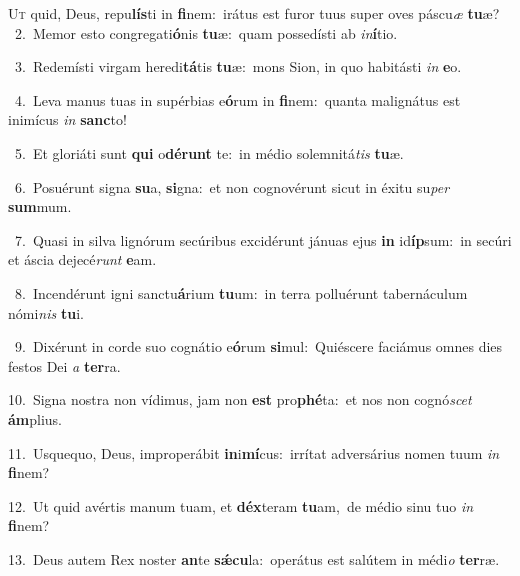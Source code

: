 \lettrine{\initial\textcolor{\initialcolor}{U}}{t} quid, Deus, repu\-\textbf{lís}\-ti in \textbf{fi}\-nem:~\star irátus est furor tuus super oves páscu\textit{æ} \textbf{tu}\-æ?\\
{\numbfont\textcolor{\numbcolor}{~2.}}~Memor esto congregati\-\textbf{ó}\-nis \textbf{tu}\-æ:~\star quam possedísti ab \textit{in}\-\textbf{í}tio.\par
{\numbfont\textcolor{\numbcolor}{~3.}}~Redemísti virgam heredi\-\textbf{tá}\-tis \textbf{tu}\-æ:~\star mons Sion, in quo habitásti \textit{in} \textbf{e}\-o.\par
{\numbfont\textcolor{\numbcolor}{~4.}}~Leva manus tuas in supérbias e\-\textbf{ó}\-rum in \textbf{fi}\-nem:~\star quanta malignátus est inimícus \textit{in} \textbf{sanc}\-to!\par
{\numbfont\textcolor{\numbcolor}{~5.}}~Et gloriáti sunt \textbf{qui} o\-\textbf{dé}\-\textbf{runt} te:~\star in médio solemnitá\textit{tis} \textbf{tu}\-æ.\par
{\numbfont\textcolor{\numbcolor}{~6.}}~Posuérunt signa \textbf{su}\-a, \textbf{si}\-gna:~\star et non cognovérunt sicut in éxitu su\textit{per} \textbf{sum}\-mum.\par
{\numbfont\textcolor{\numbcolor}{~7.}}~Quasi in silva lignórum secúribus excidérunt jánuas ejus \textbf{in} id\-\textbf{íp}\-sum:~\star in secúri et áscia dejecé\textit{runt} \textbf{e}\-am.\par
{\numbfont\textcolor{\numbcolor}{~8.}}~Incendérunt igni sanctu\-\textbf{á}\-rium \textbf{tu}\-um:~\star in terra polluérunt tabernáculum nómi\textit{nis} \textbf{tu}\-i.\par
{\numbfont\textcolor{\numbcolor}{~9.}}~Dixérunt in corde suo cognátio e\-\textbf{ó}\-rum \textbf{si}\-mul:~\star Quiéscere faciámus omnes dies festos Dei \textit{a} \textbf{ter}\-ra.\par
{\numbfont\textcolor{\numbcolor}{10.}}~Signa nostra non vídimus, jam non \textbf{est} pro\-\textbf{phé}\-ta:~\star et nos non cognó\textit{scet} \textbf{ám}\-plius.\par
{\numbfont\textcolor{\numbcolor}{11.}}~Usquequo, Deus, improperábit \textbf{in}\-i\-\textbf{mí}\-cus:~\star irrítat adversárius nomen tuum \textit{in} \textbf{fi}\-nem?\par
{\numbfont\textcolor{\numbcolor}{12.}}~Ut quid avértis manum tuam, et \textbf{déx}\-teram \textbf{tu}\-am,~\star de médio sinu tuo \textit{in} \textbf{fi}\-nem?\par
{\numbfont\textcolor{\numbcolor}{13.}}~Deus autem Rex noster \textbf{an}\-te \textbf{sǽ}\-\textbf{cu}la:~\star operátus est salútem in médi\textit{o} \textbf{ter}\-ræ.\par

